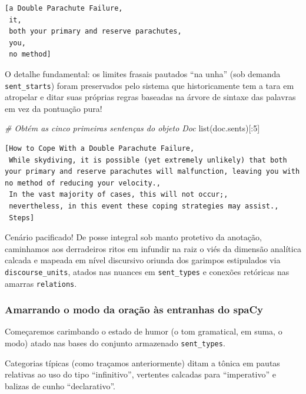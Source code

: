 \documentclass[
  brazilian,
]{article}
\newenvironment{Shaded}{}{}
\newcommand{\BuiltInTok}[1]{#1}
\newcommand{\CommentTok}[1]{\textcolor[rgb]{0.38,0.63,0.69}{\textit{#1}}}
\newcommand{\DecValTok}[1]{\textcolor[rgb]{0.25,0.63,0.44}{#1}}
\newcommand{\NormalTok}[1]{#1}
\begin{document}
\begin{verbatim}
[a Double Parachute Failure,
 it,
 both your primary and reserve parachutes,
 you,
 no method]
\end{verbatim}

O detalhe fundamental: os limites frasais pautados ``na unha'' (sob
demanda \texttt{sent\_starts}) foram preservados pelo sistema que
historicamente tem a tara em atropelar e ditar suas próprias regras
baseadas na árvore de sintaxe das palavras em vez da pontuação pura!

\begin{Shaded}
\begin{Highlighting}[]
\CommentTok{\# Obtém as cinco primeiras sentenças do objeto Doc}
\BuiltInTok{list}\NormalTok{(doc.sents)[:}\DecValTok{5}\NormalTok{]}
\end{Highlighting}
\end{Shaded}

\begin{verbatim}
[How to Cope With a Double Parachute Failure,
 While skydiving, it is possible (yet extremely unlikely) that both your primary and reserve parachutes will malfunction, leaving you with no method of reducing your velocity.,
 In the vast majority of cases, this will not occur;,
 nevertheless, in this event these coping strategies may assist.,
 Steps]
\end{verbatim}

Cenário pacificado! De posse integral sob manto protetivo da anotação,
caminhamos aos derradeiros ritos em infundir na raiz o viés da dimensão
analítica calcada e mapeada em nível discursivo oriunda dos garimpos
estipulados via \texttt{discourse\_units}, atados nas nuances em
\texttt{sent\_types} e conexões retóricas nas amarras
\texttt{relations}.

\hypertarget{amarrando-o-modo-da-orauxe7uxe3o-uxe0s-entranhas-do-spacy}{%
\subsubsection{Amarrando o modo da oração às entranhas do
spaCy}\label{amarrando-o-modo-da-orauxe7uxe3o-uxe0s-entranhas-do-spacy}}

Começaremos carimbando o estado de humor (o tom gramatical, em suma, o
modo) atado nas bases do conjunto armazenado \texttt{sent\_types}.

Categorias típicas (como traçamos anteriormente) ditam a tônica em
pautas relativas ao uso do tipo ``infinitivo'', vertentes calcadas para
``imperativo'' e balizas de cunho ``declarativo''.
\end{document}
